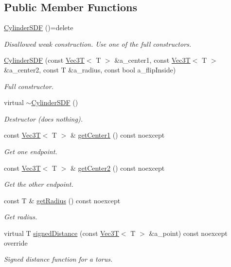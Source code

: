 \subsection*{Public Member Functions}
\begin{DoxyCompactItemize}
\item 
\mbox{\label{classCylinderSDF_a4cad4283fea40d7e4f865a29f6b5bb20}} 
\hyperlink{classCylinderSDF_a4cad4283fea40d7e4f865a29f6b5bb20}{Cylinder\+S\+DF} ()=delete
\begin{DoxyCompactList}\small\item\em Disallowed weak construction. Use one of the full constructors. \end{DoxyCompactList}\item 
\hyperlink{classCylinderSDF_a0c710e871e7e7eb37f379c79c3412607}{Cylinder\+S\+DF} (const \hyperlink{classVec3T}{Vec3T}$<$ T $>$ \&a\+\_\+center1, const \hyperlink{classVec3T}{Vec3T}$<$ T $>$ \&a\+\_\+center2, const T \&a\+\_\+radius, const bool a\+\_\+flip\+Inside)
\begin{DoxyCompactList}\small\item\em Full constructor. \end{DoxyCompactList}\item 
\mbox{\label{classCylinderSDF_a974c6b114bc5dbf88c171de5328dcaf6}} 
virtual \hyperlink{classCylinderSDF_a974c6b114bc5dbf88c171de5328dcaf6}{$\sim$\+Cylinder\+S\+DF} ()
\begin{DoxyCompactList}\small\item\em Destructor (does nothing). \end{DoxyCompactList}\item 
const \hyperlink{classVec3T}{Vec3T}$<$ T $>$ \& \hyperlink{classCylinderSDF_a7f6134d1ef1fe08ffaf43ece08c84fe0}{get\+Center1} () const noexcept
\begin{DoxyCompactList}\small\item\em Get one endpoint. \end{DoxyCompactList}\item 
const \hyperlink{classVec3T}{Vec3T}$<$ T $>$ \& \hyperlink{classCylinderSDF_aa4188d330f841f04a3f7dba6d1ef9c8f}{get\+Center2} () const noexcept
\begin{DoxyCompactList}\small\item\em Get the other endpoint. \end{DoxyCompactList}\item 
const T \& \hyperlink{classCylinderSDF_a545624c47a5a898b74059e95d44461b2}{get\+Radius} () const noexcept
\begin{DoxyCompactList}\small\item\em Get radius. \end{DoxyCompactList}\item 
virtual T \hyperlink{classCylinderSDF_a082c08089b07402d55020ed8186cc992}{signed\+Distance} (const \hyperlink{classVec3T}{Vec3T}$<$ T $>$ \&a\+\_\+point) const noexcept override
\begin{DoxyCompactList}\small\item\em Signed distance function for a torus. \end{DoxyCompactList}\end{DoxyCompactItemize}
